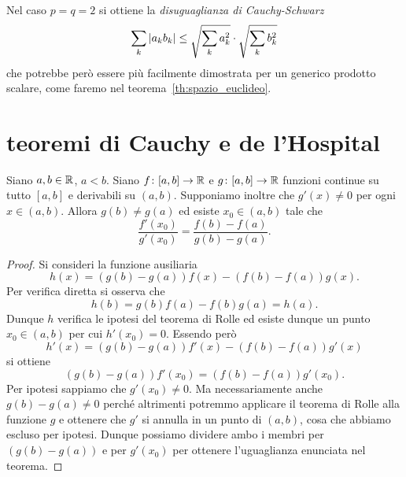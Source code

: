 Nel caso $p=q=2$ si ottiene la 
\emph{disuguaglianza di Cauchy-Schwarz}%
%
%
%
%
\[
   \sum_k {\left|a_k b_k\right|} \le \sqrt{\sum_k a_k^2} \cdot \sqrt{\sum_k b_k^2}
\]
che potrebbe però essere più facilmente dimostrata 
per un generico prodotto scalare, come faremo 
nel teorema~\ref{th:spazio_euclideo}.

\section{teoremi di Cauchy e de l'Hospital}

\begin{theorem}[Cauchy]
\label{th:cauchy}%
\mymark{**}%
%
%
%
Siano $a,b\in {\mathbb R}$, $a < b$.
%
Siano $f\colon[a,b]\to {\mathbb R}$ e $g\colon[a,b]\to {\mathbb R}$ funzioni continue su tutto $[a,b]$ e derivabili su $(a,b)$.
Supponiamo inoltre che $g'(x)\neq 0$ per ogni $x\in (a,b)$.
Allora $g(b) \neq g(a)$ ed esiste $x_0\in(a,b)$ tale che
\[
  \frac{f'(x_0)}{g'(x_0)} = \frac{f(b)-f(a)}{g(b)-g(a)}.
\]
\end{theorem}
%
\begin{proof}
\mymark{**}
Si consideri la funzione ausiliaria
\[
 h(x) = (g(b)-g(a))f(x) - (f(b)-f(a))g(x).
\]
Per verifica diretta si osserva che
\[
  h(b) = g(b)f(a) - f(b)g(a) = h(a).
\]
Dunque $h$ verifica le ipotesi del teorema di Rolle ed esiste
dunque un punto $x_0\in(a,b)$ per cui $h'(x_0) = 0$.
Essendo però
\[
  h'(x) = (g(b) - g(a)) f'(x) - (f(b)-f(a)) g'(x)
\]
si ottiene
\[
 (g(b)-g(a))f'(x_0) = (f(b) - f(a))g'(x_0).
\]
Per ipotesi sappiamo che $g'(x_0)\neq 0$.
Ma necessariamente anche $g(b) - g(a)\neq 0$ perché altrimenti potremmo applicare il teorema di Rolle alla funzione $g$ e ottenere che $g'$ si annulla in un punto di $(a,b)$, cosa che abbiamo escluso per ipotesi.
Dunque possiamo dividere ambo i membri per $(g(b)-g(a))$ e per $g'(x_0)$ per ottenere l'uguaglianza enunciata nel teorema.
\end{proof}

